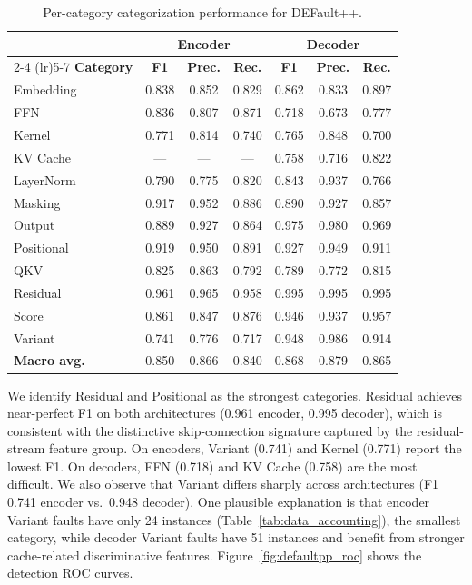 \begin{table}[!htbp]
\centering
\caption{Per-category categorization performance for DEFault++.}
\label{tab:rq1_perclass}
\small
\begin{tabular}{l c c c c c c}
\toprule
& \multicolumn{3}{c}{\textbf{Encoder}} & \multicolumn{3}{c}{\textbf{Decoder}} \\
\cmidrule(lr){2-4} \cmidrule(lr){5-7}
\textbf{Category} & \textbf{F1} & \textbf{Prec.} & \textbf{Rec.} & \textbf{F1} & \textbf{Prec.} & \textbf{Rec.} \\
\midrule
Embedding & 0.838 & 0.852 & 0.829 & 0.862 & 0.833 & 0.897 \\
FFN & 0.836 & 0.807 & 0.871 & 0.718 & 0.673 & 0.777 \\
Kernel & 0.771 & 0.814 & 0.740 & 0.765 & 0.848 & 0.700 \\
KV Cache & --- & --- & --- & 0.758 & 0.716 & 0.822 \\
LayerNorm & 0.790 & 0.775 & 0.820 & 0.843 & 0.937 & 0.766 \\
Masking & 0.917 & 0.952 & 0.886 & 0.890 & 0.927 & 0.857 \\
Output & 0.889 & 0.927 & 0.864 & 0.975 & 0.980 & 0.969 \\
Positional & 0.919 & 0.950 & 0.891 & 0.927 & 0.949 & 0.911 \\
QKV & 0.825 & 0.863 & 0.792 & 0.789 & 0.772 & 0.815 \\
Residual & 0.961 & 0.965 & 0.958 & 0.995 & 0.995 & 0.995 \\
Score & 0.861 & 0.847 & 0.876 & 0.946 & 0.937 & 0.957 \\
Variant & 0.741 & 0.776 & 0.717 & 0.948 & 0.986 & 0.914 \\
\midrule
\textbf{Macro avg.} & 0.850 & 0.866 & 0.840 & 0.868 & 0.879 & 0.865 \\
\bottomrule
\end{tabular}
\end{table}

We identify Residual and Positional as the strongest categories. Residual achieves near-perfect F1 on both architectures (0.961 encoder, 0.995 decoder), which is consistent with the distinctive skip-connection signature captured by the residual-stream feature group. On encoders, Variant (0.741) and Kernel (0.771) report the lowest F1. On decoders, FFN (0.718) and KV Cache (0.758) are the most difficult. We also observe that Variant differs sharply across architectures (F1 0.741 encoder vs.\ 0.948 decoder). One plausible explanation is that encoder Variant faults have only 24 instances (Table~\ref{tab:data_accounting}), the smallest category, while decoder Variant faults have 51 instances and benefit from stronger cache-related discriminative features. Figure~\ref{fig:defaultpp_roc} shows the detection ROC curves.

